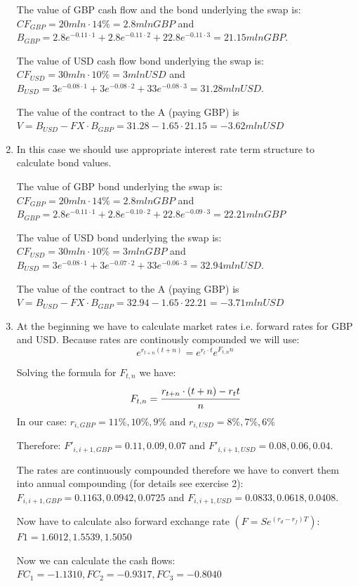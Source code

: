 \documentclass[12pt,a4paper]{exam}
\begin{document}
\begin{questions}
\begin{solution}
\begin{enumerate}[label=(\alph*),font=\itshape]
The value of GBP cash flow and the bond underlying the swap is:
$C F_{GBP}=20 mln\cdot 14\%=2.8 mln GBP$ and $B_{GBP}=2.8e^{-0.11\cdot1}+2.8e^{-0.11\cdot2}+22.8e^{-0.11\cdot 3}=21.15 mln GBP$.

The value of USD cash flow bond underlying the swap is:
$CF_{USD}=30 mln\cdot10\%=3 mln USD$ and $B_{USD}=3e^{-0.08\cdot1}+3e^{-0.08\cdot2}+33e^{-0.08\cdot3}=31.28 mln USD$.

The value of the contract to the A (paying GBP) is
$V=B_{USD}-FX\cdot B_{GBP}=31.28-1.65\cdot21.15=-3.62 mln USD$
\item In this case we should use appropriate interest rate term structure to calculate bond values.

The value of GBP bond underlying the swap is: $CF_{GBP}=20 mln\cdot14\%=2.8 mln GBP$ and $B_{GBP}=2.8e^{-0.11\cdot1}+2.8e^{-0.10\cdot 2}+22.8e^{-0.09\cdot3}=22.21 mln GBP$

The value of USD bond underlying the swap is: $CF_{USD}=30 mln\cdot 10\%=3 mln GBP$ and $B_{USD}=3e^{-0.08\cdot1}+3e^{-0.07\cdot2}+33e^{-0.06\cdot3}=32.94 mln USD$.

The value of the contract to the A (paying GBP) is $V=B_{USD}-FX\cdot B_{GBP}=32.94-1.65\cdot22.21=-3.71 mln USD$
\item At the beginning we have to calculate market rates i.e. forward rates for GBP and USD. Because rates are continously compounded we will use:
\begin{equation*}
e^{r_{t+n}(t+n)}=e^{r_t\cdot t}e^{F_{t, n}n}
\end{equation*}

Solving the formula for $F_{t, n}$ we have:
\begin{equation*}
F_{t, n}=\cfrac{r_{t+n}\cdot(t+n)-r_t t}{n}
\end{equation*}
In our case:
$r_{i,GBP}=11\%,10\%,9\%$ and $r_{i,USD}=8\%,7\%,6\%$

Therefore:
$F'_{i,i+1,GBP} = 0.11,0.09,0.07$ and $F'_{i,i+1,USD} = 0.08,0.06,0.04$.

The rates are continuously compounded therefore we have to convert them into annual compounding (for details see exercise 2):
$F_{i,i+1,GBP}=0.1163,0.0942,0.0725$ and $F_{i, i+1,USD}=0.0833,0.0618,0.0408$.

Now have to calculate also forward exchange rate $(F=Se^{(r_d-r_f)T})$:
$F1=1.6012,1.5539,1.5050$

Now we can calculate the cash flows:
$FC_1=-1.1310, FC_2=-0.9317, FC_3=-0.8040$


\end{enumerate}
\end{solution}
\end{questions}
\end{document}
